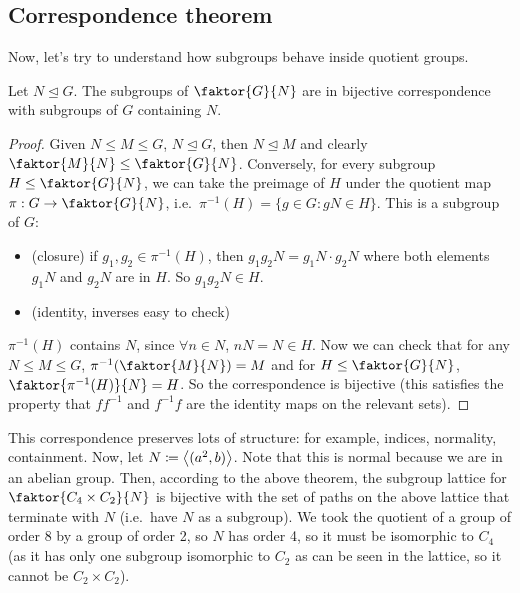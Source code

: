 \subsection{Correspondence theorem}
Now, let's try to understand how subgroups behave inside quotient groups.
\begin{theorem}
	Let \(N \trianglelefteq G\).
	The subgroups of \(\faktor{G}{N}\) are in bijective correspondence with subgroups of \(G\) containing \(N\).
\end{theorem}
\begin{proof}
	Given \(N \leq M \leq G\), \(N \trianglelefteq G\), then \(N \trianglelefteq M\) and clearly \(\faktor{M}{N} \leq \faktor{G}{N}\).
	Conversely, for every subgroup \(H \leq \faktor{G}{N}\), we can take the preimage of \(H\) under the quotient map \(\pi : G \to \faktor{G}{N}\), i.e.\ \(\pi^{-1}(H) = \{ g \in G : gN \in H \}\).
	This is a subgroup of \(G\):
	\begin{itemize}
		\item (closure) if \(g_1, g_2 \in \pi^{-1}(H)\), then \(g_1g_2N = g_1N\cdot g_2N\) where both elements \(g_1N\) and \(g_2N\) are in \(H\).
		      So \(g_1g_2N \in H\).
		\item (identity, inverses easy to check)
	\end{itemize}
	\(\pi^{-1}(H)\) contains \(N\), since \(\forall n \in N\), \(nN = N \in H\).
	Now we can check that for any \(N \leq M \leq G\), \(\pi^{-1}(\faktor{M}{N}) = M\) and for \(H \leq \faktor{G}{N}\), \(\faktor{\pi^{-1}(H)}{N} = H\).
	So the correspondence is bijective (this satisfies the property that \(ff^{-1}\) and \(f^{-1}f\) are the identity maps on the relevant sets).
\end{proof}
This correspondence preserves lots of structure: for example, indices, normality, containment.
Now, let \(N \coloneq \left\langle{} (a^2, b) \right\rangle\).
Note that this is normal because we are in an abelian group.
Then, according to the above theorem, the subgroup lattice for \(\faktor{C_4 \times C_2}{N}\) is bijective with the set of paths on the above lattice that terminate with \(N\) (i.e.\ have \(N\) as a subgroup).
We took the quotient of a group of order 8 by a group of order 2, so \(N\) has order 4, so it must be isomorphic to \(C_4\) (as it has only one subgroup isomorphic to \(C_2\) as can be seen in the lattice, so it cannot be \(C_2 \times C_2\)).

